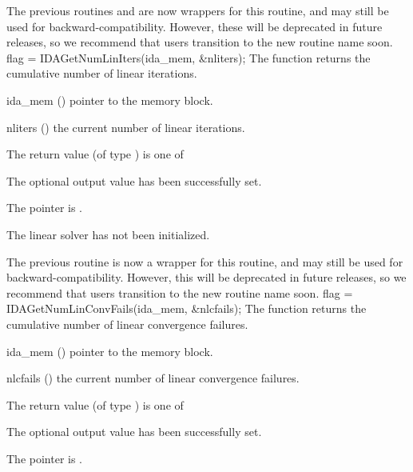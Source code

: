{{  The previous routines  and
   are now wrappers for this routine, and may
  still be used for backward-compatibility.  However, these will be
  deprecated in future releases, so we recommend that users transition
  to the new routine name soon.
}
{
  flag = IDAGetNumLinIters(ida\_mem, \&nliters);
}
{
  The function  returns the
  cumulative number of linear iterations.
}
{
  \begin{args}
  \item[ida\_mem] ()
    pointer to the {\ida} memory block.
  \item[nliters] ()
    the current number of linear iterations.
  \end{args}
}
{
  The return value  (of type ) is one of
  \begin{args}
  \item[\Id{IDALS\_SUCCESS}]
    The optional output value has been successfully set.
  \item[\Id{IDALS\_MEM\_NULL}]
    The  pointer is .
  \item[\Id{IDALS\_LMEM\_NULL}]
    The {\idals} linear solver has not been initialized.
  \end{args}
}
{
  The previous routine  is now a wrapper for
  this routine, and may still be used for backward-compatibility.
  However, this will be deprecated in future releases, so we recommend
  that users transition to the new routine name soon.
}
{
  flag = IDAGetNumLinConvFails(ida\_mem, \&nlcfails);
}
{
  The function  returns the
  cumulative number of linear convergence failures.
}
{
  \begin{args}
  \item[ida\_mem] ()
    pointer to the {\ida} memory block.
  \item[nlcfails] ()
    the current number of linear convergence failures.
  \end{args}
}
{
  The return value  (of type ) is one of
  \begin{args}
  \item[\Id{IDALS\_SUCCESS}]
    The optional output value has been successfully set.
  \item[\Id{IDALS\_MEM\_NULL}]
    The  pointer is .

\end{args}}}
